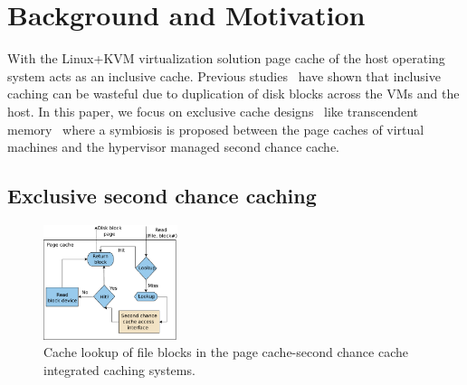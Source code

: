\section{Background and Motivation}
\label{sec:bg}
%
With the Linux+KVM virtualization solution page cache of the
host operating system acts as an inclusive cache.
%
Previous studies~\cite{kvmzcache,singleton} have shown that
inclusive caching can be wasteful due to duplication of disk blocks 
across the VMs and the host. 
%
In this paper, we focus on exclusive cache designs~\cite{memtrans} 
like transcendent memory~\cite{memtrans} 
where a symbiosis is proposed between 
the page caches of virtual machines and the hypervisor managed
second chance cache.




\subsection{Exclusive second chance caching}
\label{subsec:hcache}

\begin{figure}[t]
\centering
\includegraphics[width=0.35\textwidth]{images/cc_get}
 \caption{Cache lookup of file blocks in the page cache-second chance
cache integrated caching systems.}
 \label{fig:cc_get}
\vspace{-0.4cm}
\end{figure}


